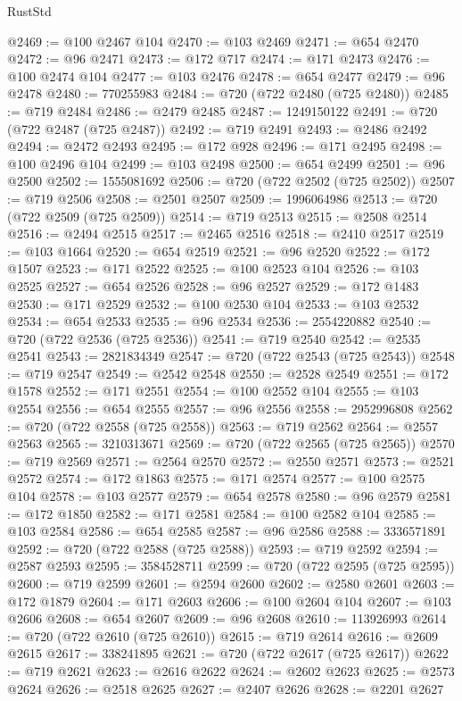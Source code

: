 \begin{lexlean}{RustStd}
\begin{coremodule}
@2469 := @100 @2467 @104
@2470 := @103 @2469
@2471 := @654 @2470
@2472 := @96 @2471
@2473 := @172 @717
@2474 := @171 @2473
@2476 := @100 @2474 @104
@2477 := @103 @2476
@2478 := @654 @2477
@2479 := @96 @2478
@2480 := 770255983
@2484 := @720 (@722 @2480 (@725 @2480))
@2485 := @719 @2484
@2486 := @2479 @2485
@2487 := 1249150122
@2491 := @720 (@722 @2487 (@725 @2487))
@2492 := @719 @2491
@2493 := @2486 @2492
@2494 := @2472 @2493
@2495 := @172 @928
@2496 := @171 @2495
@2498 := @100 @2496 @104
@2499 := @103 @2498
@2500 := @654 @2499
@2501 := @96 @2500
@2502 := 1555081692
@2506 := @720 (@722 @2502 (@725 @2502))
@2507 := @719 @2506
@2508 := @2501 @2507
@2509 := 1996064986
@2513 := @720 (@722 @2509 (@725 @2509))
@2514 := @719 @2513
@2515 := @2508 @2514
@2516 := @2494 @2515
@2517 := @2465 @2516
@2518 := @2410 @2517
@2519 := @103 @1664
@2520 := @654 @2519
@2521 := @96 @2520
@2522 := @172 @1507
@2523 := @171 @2522
@2525 := @100 @2523 @104
@2526 := @103 @2525
@2527 := @654 @2526
@2528 := @96 @2527
@2529 := @172 @1483
@2530 := @171 @2529
@2532 := @100 @2530 @104
@2533 := @103 @2532
@2534 := @654 @2533
@2535 := @96 @2534
@2536 := 2554220882
@2540 := @720 (@722 @2536 (@725 @2536))
@2541 := @719 @2540
@2542 := @2535 @2541
@2543 := 2821834349
@2547 := @720 (@722 @2543 (@725 @2543))
@2548 := @719 @2547
@2549 := @2542 @2548
@2550 := @2528 @2549
@2551 := @172 @1578
@2552 := @171 @2551
@2554 := @100 @2552 @104
@2555 := @103 @2554
@2556 := @654 @2555
@2557 := @96 @2556
@2558 := 2952996808
@2562 := @720 (@722 @2558 (@725 @2558))
@2563 := @719 @2562
@2564 := @2557 @2563
@2565 := 3210313671
@2569 := @720 (@722 @2565 (@725 @2565))
@2570 := @719 @2569
@2571 := @2564 @2570
@2572 := @2550 @2571
@2573 := @2521 @2572
@2574 := @172 @1863
@2575 := @171 @2574
@2577 := @100 @2575 @104
@2578 := @103 @2577
@2579 := @654 @2578
@2580 := @96 @2579
@2581 := @172 @1850
@2582 := @171 @2581
@2584 := @100 @2582 @104
@2585 := @103 @2584
@2586 := @654 @2585
@2587 := @96 @2586
@2588 := 3336571891
@2592 := @720 (@722 @2588 (@725 @2588))
@2593 := @719 @2592
@2594 := @2587 @2593
@2595 := 3584528711
@2599 := @720 (@722 @2595 (@725 @2595))
@2600 := @719 @2599
@2601 := @2594 @2600
@2602 := @2580 @2601
@2603 := @172 @1879
@2604 := @171 @2603
@2606 := @100 @2604 @104
@2607 := @103 @2606
@2608 := @654 @2607
@2609 := @96 @2608
@2610 := 113926993
@2614 := @720 (@722 @2610 (@725 @2610))
@2615 := @719 @2614
@2616 := @2609 @2615
@2617 := 338241895
@2621 := @720 (@722 @2617 (@725 @2617))
@2622 := @719 @2621
@2623 := @2616 @2622
@2624 := @2602 @2623
@2625 := @2573 @2624
@2626 := @2518 @2625
@2627 := @2407 @2626
@2628 := @2201 @2627

\end{coremodule}
\end{lexlean}

